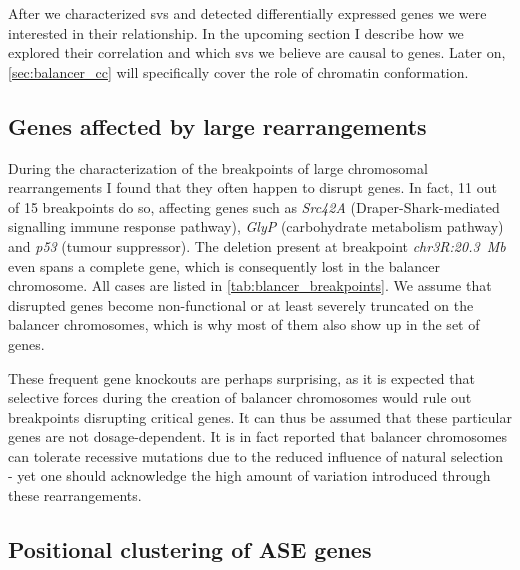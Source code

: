 After we characterized \acp{sv} and detected differentially expressed genes we
were interested in their relationship. In the upcoming section I describe how we
explored their correlation and which \acp{sv} we believe are causal to \ase
genes. Later on, \cref{sec:balancer_cc} will specifically cover the role of
chromatin conformation.



\subsection{Genes affected by large rearrangements}
\label{sec:balancer_ase_breakpoints}

During the characterization of the breakpoints of large chromosomal
rearrangements I found that they often happen to disrupt genes. In fact, 11 out
of 15 breakpoints do so, affecting genes such as \textit{Src42A}
(Draper-Shark-mediated signalling immune response pathway), \textit{GlyP}
(carbohydrate metabolism pathway) and \textit{p53} (tumour suppressor). The
deletion present at breakpoint \textit{chr3R:20.3~Mb} even spans a complete
gene, which is consequently lost in the balancer chromosome. All cases are
listed in \cref{tab:blancer_breakpoints}. We assume that disrupted genes become
non-functional or at least severely truncated on the balancer chromosomes,
which is why most of them also show up in the set of \ase genes.

These frequent gene knockouts are perhaps surprising, as it is expected that
selective forces during the creation of balancer chromosomes would rule out
breakpoints disrupting critical genes. It can thus be assumed that these
particular genes are not dosage-dependent. It is in fact reported that balancer
chromosomes can tolerate recessive mutations due to the reduced influence of
natural selection \citep{Araye2013} - yet one should acknowledge the high amount
of variation introduced through these rearrangements.




\subsection{Positional clustering of ASE genes}
\label{sec:balancer_ase_clustering}

